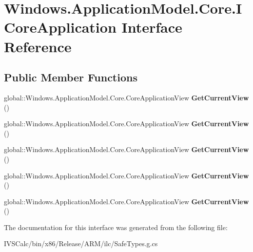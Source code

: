 \hypertarget{interface_windows_1_1_application_model_1_1_core_1_1_i_core_application}{}\section{Windows.\+Application\+Model.\+Core.\+I\+Core\+Application Interface Reference}
\label{interface_windows_1_1_application_model_1_1_core_1_1_i_core_application}
\subsection*{Public Member Functions}
\begin{DoxyCompactItemize}
\item 
\mbox{\label{interface_windows_1_1_application_model_1_1_core_1_1_i_core_application_ae463fe7410a0e42b39754e93c45fdddd}} 
global\+::\+Windows.\+Application\+Model.\+Core.\+Core\+Application\+View {\bfseries Get\+Current\+View} ()
\item 
\mbox{\label{interface_windows_1_1_application_model_1_1_core_1_1_i_core_application_ae463fe7410a0e42b39754e93c45fdddd}} 
global\+::\+Windows.\+Application\+Model.\+Core.\+Core\+Application\+View {\bfseries Get\+Current\+View} ()
\item 
\mbox{\label{interface_windows_1_1_application_model_1_1_core_1_1_i_core_application_ae463fe7410a0e42b39754e93c45fdddd}} 
global\+::\+Windows.\+Application\+Model.\+Core.\+Core\+Application\+View {\bfseries Get\+Current\+View} ()
\item 
\mbox{\label{interface_windows_1_1_application_model_1_1_core_1_1_i_core_application_ae463fe7410a0e42b39754e93c45fdddd}} 
global\+::\+Windows.\+Application\+Model.\+Core.\+Core\+Application\+View {\bfseries Get\+Current\+View} ()
\item 
\mbox{\label{interface_windows_1_1_application_model_1_1_core_1_1_i_core_application_ae463fe7410a0e42b39754e93c45fdddd}} 
global\+::\+Windows.\+Application\+Model.\+Core.\+Core\+Application\+View {\bfseries Get\+Current\+View} ()
\end{DoxyCompactItemize}


The documentation for this interface was generated from the following file\+:\begin{DoxyCompactItemize}
\item 
I\+V\+S\+Calc/bin/x86/\+Release/\+A\+R\+M/ilc/Safe\+Types.\+g.\+cs\end{DoxyCompactItemize}
